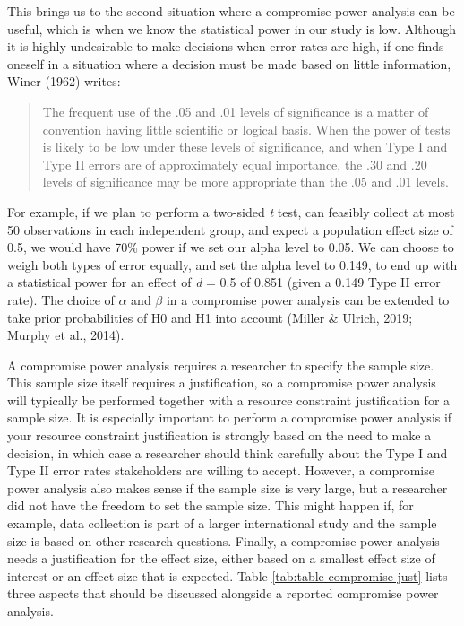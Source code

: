 \documentclass[
  english,
  ,jou, a4paper,floatsintext]{apa6}
\begin{document}
This brings us to the second situation where a compromise power analysis can be useful, which is when we know the statistical power in our study is low. Although it is highly undesirable to make decisions when error rates are high, if one finds oneself in a situation where a decision must be made based on little information, Winer (1962) writes:

\begin{quote}
The frequent use of the .05 and .01 levels of significance is a matter of convention having little scientific or logical basis. When the power of tests is likely to be low under these levels of significance, and when Type I and Type II errors are of approximately equal importance, the .30 and .20 levels of significance may be more appropriate than the .05 and .01 levels.
\end{quote}

For example, if we plan to perform a two-sided \emph{t} test, can feasibly collect at most 50 observations in each independent group, and expect a population effect size of 0.5, we would have 70\% power if we set our alpha level to 0.05. We can choose to weigh both types of error equally, and set the alpha level to 0.149, to end up with a statistical power for an effect of \emph{d} = 0.5 of 0.851 (given a 0.149 Type II error rate). The choice of \(\alpha\) and \(\beta\) in a compromise power analysis can be extended to take prior probabilities of H0 and H1 into account (Miller \& Ulrich, 2019; Murphy et al., 2014).

A compromise power analysis requires a researcher to specify the sample size. This sample size itself requires a justification, so a compromise power analysis will typically be performed together with a resource constraint justification for a sample size. It is especially important to perform a compromise power analysis if your resource constraint justification is strongly based on the need to make a decision, in which case a researcher should think carefully about the Type I and Type II error rates stakeholders are willing to accept. However, a compromise power analysis also makes sense if the sample size is very large, but a researcher did not have the freedom to set the sample size. This might happen if, for example, data collection is part of a larger international study and the sample size is based on other research questions. Finally, a compromise power analysis needs a justification for the effect size, either based on a smallest effect size of interest or an effect size that is expected. Table \ref{tab:table-compromise-just} lists three aspects that should be discussed alongside a reported compromise power analysis.
\end{document}

